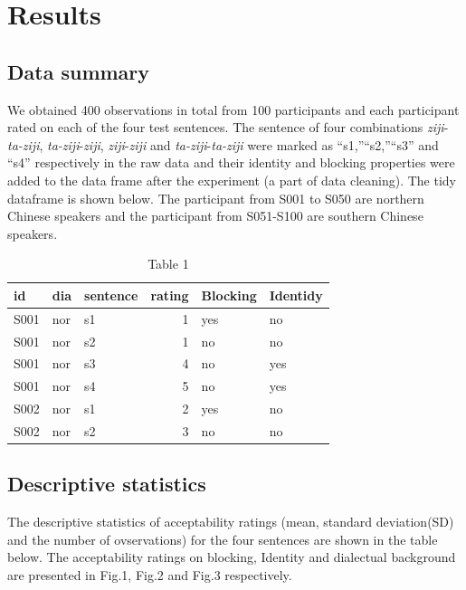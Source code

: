 \documentclass[
  english,
  man,floatsintext]{apa6}
\begin{document}
\hypertarget{results}{%
\section{Results}\label{results}}

\hypertarget{data-summary}{%
\subsection{Data summary}\label{data-summary}}

We obtained 400 observations in total from 100 participants and each participant rated on each of the four test sentences. The sentence of four combinations \emph{ziji}-\emph{ta-ziji}, \emph{ta-ziji}-\emph{ziji}, \emph{ziji}-\emph{ziji} and \emph{ta-ziji}-\emph{ta-ziji} were marked as ``s1,''``s2,''``s3'' and ``s4'' respectively in the raw data and their identity and blocking properties were added to the data frame after the experiment (a part of data cleaning). The tidy dataframe is shown below. The participant from S001 to S050 are northern Chinese speakers and the participant from S051-S100 are southern Chinese speakers.

\begin{table}

\caption{\label{tab:df}Table 1}
\centering
\begin{tabular}[t]{l|l|l|r|l|l}
\hline
id & dia & sentence & rating & Blocking & Identidy\\
\hline
S001 & nor & s1 & 1 & yes & no\\
\hline
S001 & nor & s2 & 1 & no & no\\
\hline
S001 & nor & s3 & 4 & no & yes\\
\hline
S001 & nor & s4 & 5 & no & yes\\
\hline
S002 & nor & s1 & 2 & yes & no\\
\hline
S002 & nor & s2 & 3 & no & no\\
\hline
\end{tabular}
\end{table}

\hypertarget{descriptive-statistics}{%
\subsection{Descriptive statistics}\label{descriptive-statistics}}

The descriptive statistics of acceptability ratings (mean, standard deviation(SD) and the number of ovservations) for the four sentences are shown in the table below. The acceptability ratings on blocking, Identity and dialectual background are presented in Fig.1, Fig.2 and Fig.3 respectively.
\end{document}
